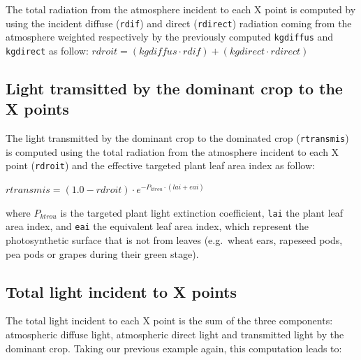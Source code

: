 \documentclass[
]{book}
\begin{document}
The total radiation from the atmosphere incident to each X point is computed by using the incident diffuse (\texttt{rdif}) and direct (\texttt{rdirect}) radiation coming from the atmosphere weighted respectively by the previously computed \texttt{kgdiffus} and \texttt{kgdirect} as follow:
\(rdroit=(kgdiffus\cdot rdif)+(kgdirect\cdot rdirect)\)

\hypertarget{light-tramsitted-by-the-dominant-crop-to-the-x-points}{%
\subsection{Light tramsitted by the dominant crop to the X points}\label{light-tramsitted-by-the-dominant-crop-to-the-x-points}}

The light transmitted by the dominant crop to the dominated crop (\texttt{rtransmis}) is computed using the total radiation from the atmosphere incident to each X point (\texttt{rdroit}) and the effective targeted plant leaf area index as follow:

\(rtransmis=(1.0-rdroit)\cdot e^{-P_{ktrou}\cdot(lai+eai)}\)

where \(P_{ktrou}\) is the targeted plant light extinction coefficient, \texttt{lai} the plant leaf area index, and \texttt{eai} the equivalent leaf area index, which represent the photosynthetic surface that is not from leaves (e.g.~wheat ears, rapeseed pods, pea pods or grapes during their green stage).

\hypertarget{total-light-incident-to-x-points}{%
\subsection{Total light incident to X points}\label{total-light-incident-to-x-points}}

The total light incident to each X point is the sum of the three components: atmospheric diffuse light, atmospheric direct light and transmitted light by the dominant crop.
Taking our previous example again, this computation leads to:
\end{document}
